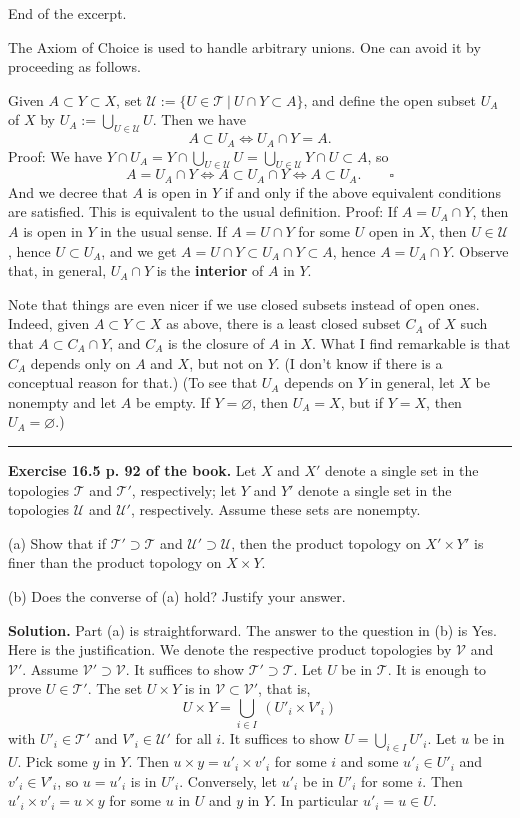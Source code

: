 \documentclass[12pt,letterpaper]{article}
\newcommand{\mc}{\mathcal}
\newcommand{\noi}{\noindent}%
\begin{document}
\noi End of the excerpt. 

The Axiom of Choice is used to handle arbitrary unions. One can avoid it by proceeding as follows. 

Given $A\subset Y\subset X$, set $\mc U:=\{U\in\mc T\ |\ U\cap Y\subset A\}$, and define the open subset $U_A$ of $X$ by $U_A:=\bigcup_{U\in\mc U}U$. Then we have 
$$
A\subset U_A\iff U_A\cap Y=A.
$$ 
Proof: We have $Y\cap U_A=Y\cap\bigcup_{U\in\mc U}U=\bigcup_{U\in\mc U}Y\cap U\subset A$, so 
$$A=U_A\cap Y\iff A\subset U_A\cap Y\iff A\subset U_A.\qquad\square
$$
And we decree that $A$ is open in $Y$ if and only if the above equivalent conditions are satisfied. This is equivalent to the usual definition. Proof: If $A=U_A\cap Y$, then $A$ is open in $Y$ in the usual sense. If $A=U\cap Y$ for some $U$ open in $X$, then $U\in\mc U$, hence $U\subset U_A$, and we get $A=U\cap Y\subset U_A\cap Y\subset A$, hence $A=U_A\cap Y$. Observe that, in general, $U_A\cap Y$ is the \textbf{interior} of $A$ in $Y$. 

Note that things are even nicer if we use closed subsets instead of open ones. Indeed, given $A\subset Y\subset X$ as above, there is a least closed subset $C_A$ of $X$ such that $A\subset C_A\cap Y$, and $C_A$ is the closure of $A$ in $X$. What I find remarkable is that $C_A$ depends only on $A$ and $X$, but not on $Y$. (I don't know if there is a conceptual reason for that.) (To see that $U_A$ depends on $Y$ in general, let $X$ be nonempty and let $A$ be empty. If $Y=\varnothing$, then $U_A=X$, but if $Y=X$, then $U_A=\varnothing$.) \bigskip 

\hrule\medskip

\noi\textbf{Exercise 16.5 p. 92 of the book.} Let $X$ and $X'$ denote a single set in the topologies $\mc T$ and $\mc T'$, respectively; let $Y$ and $Y'$ denote a single set in the topologies $\mc U$ and $\mc U'$, respectively. Assume these sets are nonempty.

\noi(a) Show that if $\mc T'\supset\mc T$ and $\mc U'\supset\mc U$, then the product topology on $X'\times Y'$ is finer than the product topology on $X\times Y$.

\noi(b) Does the converse of (a) hold? Justify your answer.

\noi\textbf{Solution.} Part (a) is straightforward. The answer to the question in (b) is Yes. Here is the justification. We denote the respective product topologies by $\mc V$ and $\mc V'$.  Assume $\mc V'\supset\mc V$. It suffices to show $\mc T'\supset\mc T$. Let $U$ be in $\mc T$. It is enough to prove $U\in\mc T'$. The set $U\times Y$ is in $\mc V\subset\mc V'$, that is, 
$$
U\times Y=\bigcup_{i\in I}\ (U'_i\times V'_i)
$$ 
with $U'_i\in\mc T'$ and $V'_i\in\mc U'$ for all $i$. It suffices to show $U=\bigcup_{i\in I}U'_i$. Let $u$ be in $U$. Pick some $y$ in $Y$. Then $u\times y=u'_i\times v'_i$ for some $i$ and some $u'_i\in U'_i$ and $v'_i\in V'_i$, so $u=u'_i$ is in $U'_i$. Conversely, let $u'_i$ be in $U'_i$ for some $i$. Then $u'_i\times v'_i=u\times y$ for some $u$ in $U$ and $y$ in $Y$. In particular $u'_i=u\in U$. 
\end{document}
